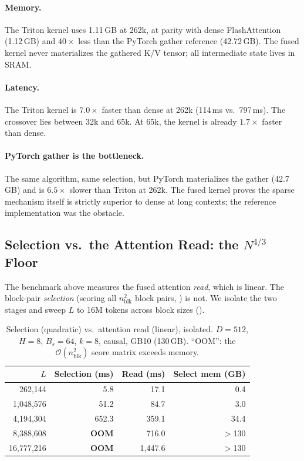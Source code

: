 \documentclass[10pt,letterpaper]{article}
\newcommand{\Ocomplex}{\mathcal{O}}
\begin{document}
\paragraph{Memory.} The Triton kernel uses 1.11\,GB at 262k, at parity with
dense FlashAttention (1.12\,GB) and $40\times$ less than the PyTorch
gather reference (42.72\,GB). The fused kernel never materializes the
gathered K/V tensor; all intermediate state lives in SRAM.

\paragraph{Latency.} The Triton kernel is $7.0\times$ faster than dense at
262k (114\,ms vs.\ 797\,ms). The crossover lies between 32k and 65k. At
65k, the kernel is already $1.7\times$ faster than dense.

\paragraph{PyTorch gather is the bottleneck.} The same algorithm, same
selection, but PyTorch materializes the gather (42.7\,GB) and is $6.5\times$
slower than Triton at 262k. The fused kernel proves the sparse mechanism
itself is strictly superior to dense at long contexts; the reference
implementation was the obstacle.

\subsection{Selection vs.\ the Attention Read: the $N^{4/3}$ Floor}
\label{sec:floor}

The benchmark above measures the fused attention \emph{read}, which is linear.
The block-pair \emph{selection} (scoring all $n_{\text{blk}}^2$ block pairs,
) is not. We isolate the two stages and sweep $L$ to 16M
tokens across block sizes ().

\begin{table}[h]
\centering
\caption{Selection (quadratic) vs.\ attention read (linear), isolated.
$D{=}512$, $H{=}8$, $B_s{=}64$, $k{=}8$, causal, GB10 (130\,GB). ``OOM'': the
$\Ocomplex(n_{\text{blk}}^2)$ score matrix exceeds memory.}
\label{tab:floor}
\small
\begin{tabular}{rrrr}
\toprule
$L$ & Selection (ms) & Read (ms) & Select mem (GB) \\
\midrule
262,144 & 5.8 & 17.1 & 0.4 \\
1,048,576 & 51.2 & 84.7 & 3.0 \\
4,194,304 & 652.3 & 359.1 & 34.4 \\
8,388,608 & \textbf{OOM} & 716.0 & $>$130 \\
16,777,216 & \textbf{OOM} & 1{,}447.6 & $>$130 \\
\bottomrule
\end{tabular}
\end{table}
\end{document}
